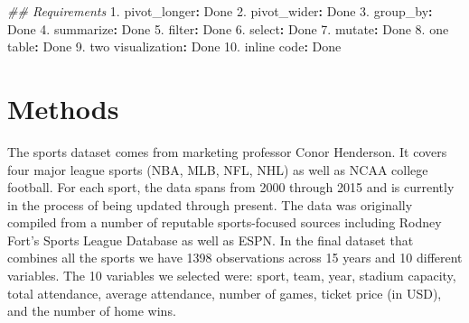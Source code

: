 \documentclass[man, fleqn, noextraspace,floatsintext]{apa6}
\newenvironment{Shaded}{\begin{snugshade}}{\end{snugshade}}
\newcommand{\CommentTok}[1]{\textcolor[rgb]{0.56,0.35,0.01}{\textit{#1}}}
\newcommand{\DataTypeTok}[1]{\textcolor[rgb]{0.13,0.29,0.53}{#1}}
\newcommand{\DecValTok}[1]{\textcolor[rgb]{0.00,0.00,0.81}{#1}}
\newcommand{\FloatTok}[1]{\textcolor[rgb]{0.00,0.00,0.81}{#1}}
\newcommand{\KeywordTok}[1]{\textcolor[rgb]{0.13,0.29,0.53}{\textbf{#1}}}
\newcommand{\NormalTok}[1]{#1}
\newcommand{\OperatorTok}[1]{\textcolor[rgb]{0.81,0.36,0.00}{\textbf{#1}}}
\newcommand{\StringTok}[1]{\textcolor[rgb]{0.31,0.60,0.02}{#1}}
\begin{document}
\begin{Shaded}
\end{Shaded}

\begin{Shaded}
\begin{Highlighting}[]
\CommentTok{## Requirements }
\FloatTok{1.}\NormalTok{ pivot_longer}\OperatorTok{:}\StringTok{ }\NormalTok{Done}
\FloatTok{2.}\NormalTok{ pivot_wider}\OperatorTok{:}\StringTok{ }\NormalTok{Done}
\FloatTok{3.}\NormalTok{ group_by}\OperatorTok{:}\StringTok{ }\NormalTok{Done}
\FloatTok{4.}\NormalTok{ summarize}\OperatorTok{:}\StringTok{ }\NormalTok{Done}
\FloatTok{5.}\NormalTok{ filter}\OperatorTok{:}\StringTok{ }\NormalTok{Done}
\FloatTok{6.}\NormalTok{ select}\OperatorTok{:}\StringTok{ }\NormalTok{Done}
\FloatTok{7.}\NormalTok{ mutate}\OperatorTok{:}\StringTok{ }\NormalTok{Done }
\FloatTok{8.}\NormalTok{ one table}\OperatorTok{:}\StringTok{ }\NormalTok{Done}
\FloatTok{9.}\NormalTok{ two visualization}\OperatorTok{:}\StringTok{ }\NormalTok{Done}
\FloatTok{10.}\NormalTok{ inline code}\OperatorTok{:}\StringTok{ }\NormalTok{Done}
\end{Highlighting}
\end{Shaded}

\hypertarget{methods}{%
\section{Methods}\label{methods}}

The sports dataset comes from marketing professor Conor Henderson. It covers four major league sports (NBA, MLB, NFL, NHL) as well as NCAA college football. For each sport, the data spans from 2000 through 2015 and is currently in the process of being updated through present. The data was originally compiled from a number of reputable sports-focused sources including Rodney Fort's Sports League Database as well as ESPN.
In the final dataset that combines all the sports we have 1398 observations across 15 years and 10 different variables. The 10 variables we selected were: sport, team, year, stadium capacity, total attendance, average attendance, number of games, ticket price (in USD), and the number of home wins.
\end{document}
